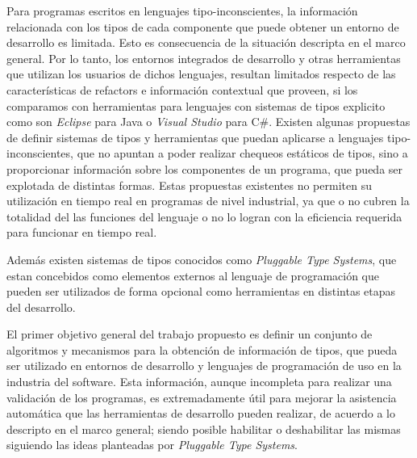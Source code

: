 \documentclass[a4paper,10pt]{article}
\begin{document}
Para programas escritos en lenguajes tipo-inconscientes, la información relacionada con los tipos de cada componente que puede obtener un entorno de desarrollo es limitada. Esto es consecuencia de la situación descripta en el marco general.
Por lo tanto, los entornos integrados de desarrollo y otras herramientas que utilizan los usuarios de dichos lenguajes, resultan limitados respecto de las características de refactors e información contextual que proveen, si los comparamos con herramientas para lenguajes con sistemas de tipos explicito como son \emph{Eclipse} para Java o \emph{Visual Studio} para C\#. 
Existen algunas propuestas de definir sistemas de tipos y herramientas que puedan aplicarse a lenguajes tipo-inconscientes, que no apuntan a poder realizar chequeos estáticos de tipos, sino a proporcionar información sobre los componentes de un programa, que pueda ser explotada de distintas formas. Estas propuestas existentes no permiten su utilización en tiempo real en programas de nivel industrial, ya que o no cubren la totalidad del las funciones del lenguaje\cite{Pluq09a} o no lo logran con la eficiencia requerida para funcionar en tiempo real\cite{Ages96a}.

Además existen sistemas de tipos conocidos como \emph{Pluggable Type Systems}\cite{Brac04a}, que estan concebidos como elementos externos al lenguaje de programación que pueden ser utilizados de forma opcional como herramientas en distintas etapas del desarrollo.

El primer objetivo general del trabajo propuesto es definir un conjunto de algoritmos y mecanismos para la obtención de información de tipos, que pueda ser utilizado en entornos de desarrollo y lenguajes de programación de uso en la industria del software.
Esta información, aunque incompleta para realizar una validación de los programas, es extremadamente útil para mejorar la asistencia automática que las herramientas de desarrollo pueden realizar, de acuerdo a lo descripto en el marco general; siendo posible habilitar o deshabilitar las mismas siguiendo las ideas planteadas por \emph{Pluggable Type Systems}.
\end{document}
